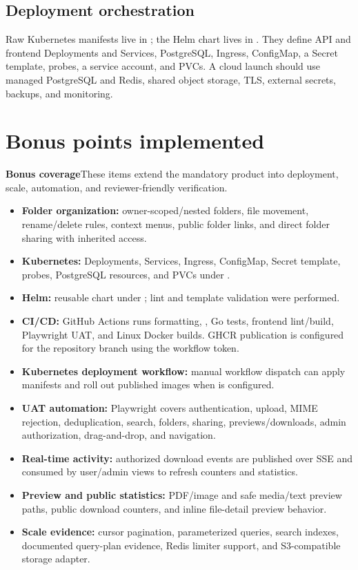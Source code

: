 \documentclass[11pt,a4paper]{article}
\newcommand{\featurebadge}[2]{\fcolorbox{#1}{wash}{\textcolor{#1}{\textbf{\small #2}}}}
\begin{document}
\subsection{Deployment orchestration}
Raw Kubernetes manifests live in ; the Helm chart lives in . They define API and frontend Deployments and Services, PostgreSQL, Ingress, ConfigMap, a Secret template, probes, a service account, and PVCs. A cloud launch should use managed PostgreSQL and Redis, shared object storage, TLS, external secrets, backups, and monitoring.

\section{Bonus points implemented}
\begin{tcolorbox}[enhanced,colback=violet!9,colframe=violet!75!black,boxrule=0.8pt,arc=5pt,left=10pt,right=10pt,top=7pt,bottom=7pt]
\featurebadge{violet!75!black}{BEYOND THE CORE}\quad\textbf{Bonus coverage}\quad\small These items extend the mandatory product into deployment, scale, automation, and reviewer-friendly verification.
\end{tcolorbox}
\begin{itemize}
\item \textbf{Folder organization:} owner-scoped/nested folders, file movement, rename/delete rules, context menus, public folder links, and direct folder sharing with inherited access.
\item \textbf{Kubernetes:} Deployments, Services, Ingress, ConfigMap, Secret template, probes, PostgreSQL resources, and PVCs under .
\item \textbf{Helm:} reusable chart under ; lint and template validation were performed.
\item \textbf{CI/CD:} GitHub Actions runs formatting, , Go tests, frontend lint/build, Playwright UAT, and Linux Docker builds. GHCR publication is configured for the repository branch using the workflow token.
\item \textbf{Kubernetes deployment workflow:} manual workflow dispatch can apply manifests and roll out published images when  is configured.
\item \textbf{UAT automation:} Playwright covers authentication, upload, MIME rejection, deduplication, search, folders, sharing, previews/downloads, admin authorization, drag-and-drop, and navigation.
\item \textbf{Real-time activity:} authorized download events are published over SSE and consumed by user/admin views to refresh counters and statistics.
\item \textbf{Preview and public statistics:} PDF/image and safe media/text preview paths, public download counters, and inline file-detail preview behavior.
\item \textbf{Scale evidence:} cursor pagination, parameterized queries, search indexes, documented query-plan evidence, Redis limiter support, and S3-compatible storage adapter.
\end{itemize}
\end{document}

